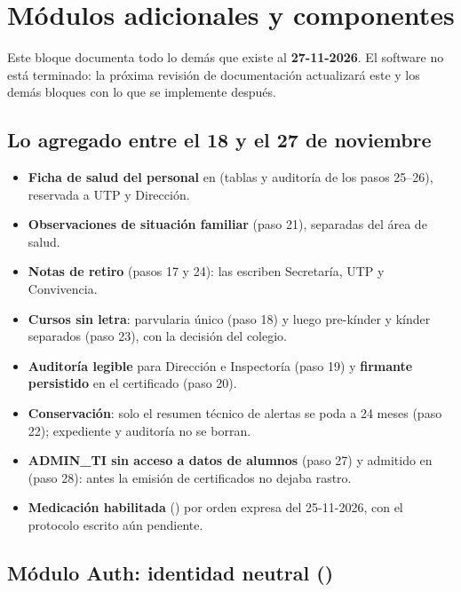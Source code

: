\section{Módulos adicionales y componentes}

Este bloque documenta todo lo demás que existe al \textbf{27-11-2026}. El
software no está terminado: la próxima revisión de documentación actualizará
este y los demás bloques con lo que se implemente después.

\subsection{Lo agregado entre el 18 y el 27 de noviembre}

\begin{itemize}[leftmargin=*,itemsep=0.2em]
\item \textbf{Ficha de salud del personal} en 
  (tablas y auditoría de los pasos 25--26), reservada a UTP y Dirección.
\item \textbf{Observaciones de situación familiar} (paso 21), separadas del
  área de salud.
\item \textbf{Notas de retiro} (pasos 17 y 24): las escriben Secretaría, UTP
  y Convivencia.
\item \textbf{Cursos sin letra}: parvularia único (paso 18) y luego
  pre-kínder y kínder separados (paso 23), con la decisión del colegio.
\item \textbf{Auditoría legible} para Dirección e Inspectoría (paso 19) y
  \textbf{firmante persistido} en el certificado (paso 20).
\item \textbf{Conservación}: solo el resumen técnico de alertas se poda a 24
  meses (paso 22); expediente y auditoría no se borran.
\item \textbf{ADMIN\_TI sin acceso a datos de alumnos} (paso 27) y
  \textbf{} admitido en  (paso 28):
  antes la emisión de certificados no dejaba rastro.
\item \textbf{Medicación habilitada} () por
  orden expresa del 25-11-2026, con el protocolo escrito aún pendiente.
\end{itemize}

\subsection{Módulo Auth: identidad neutral ()}

